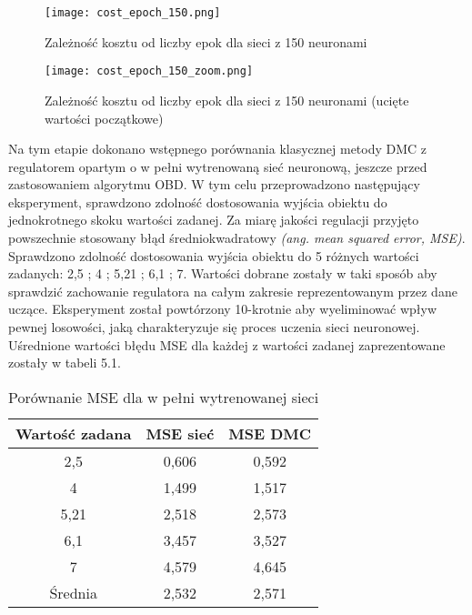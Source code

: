 \begin{figure}[!htb]
  \label{fig:Koszt-liczba-epok}
  \centering \texttt{[image: cost\_epoch\_150.png]}
  \caption{Zależność kosztu od liczby epok dla sieci z 150 neuronami}
\end{figure}

\begin{figure}[!htb]
  \label{fig:Koszt-liczba-epok-zoom}
  \centering \texttt{[image: cost\_epoch\_150\_zoom.png]}
  \caption{Zależność kosztu od liczby epok dla sieci z 150 neuronami (ucięte wartości początkowe)}
\end{figure}

\par Na tym etapie dokonano wstępnego porównania klasycznej metody DMC z regulatorem opartym o w pełni wytrenowaną sieć neuronową, jeszcze przed zastosowaniem algorytmu OBD. W tym celu przeprowadzono następujący eksperyment, sprawdzono zdolność dostosowania wyjścia obiektu do jednokrotnego skoku wartości zadanej. Za miarę jakości regulacji przyjęto powszechnie stosowany błąd średniokwadratowy \emph{(ang. mean squared error, MSE)}. Sprawdzono zdolność dostosowania wyjścia obiektu do 5 różnych wartości zadanych: 2,5 ; 4 ; 5,21 ; 6,1 ; 7. Wartości dobrane zostały w taki sposób aby sprawdzić zachowanie regulatora na całym zakresie reprezentowanym przez dane uczące. Eksperyment został powtórzony 10-krotnie aby wyeliminować wpływ pewnej losowości, jaką charakteryzuje się proces uczenia sieci neuronowej. Uśrednione wartości błędu MSE dla każdej z wartości zadanej zaprezentowane zostały w tabeli 5.1.
\begin{table}[!h] \label{tab:tabela1} \centering
\caption{Porównanie MSE dla w pełni wytrenowanej sieci}
\begin{tabular} {| c | c | c |} \hline
    Wartość zadana & MSE sieć & MSE DMC \\ \hline\hline
    2,5 & 0,606 & 0,592 \\ \hline
    4 & 1,499 & 1,517 \\ \hline
    5,21 & 2,518 & 2,573 \\ \hline
    6,1 & 3,457 & 3,527 \\ \hline
    7 & 4,579 & 4,645 \\ \hline
    Średnia & 2,532 & 2,571 \\ \hline
    
\end{tabular}
\end{table}
